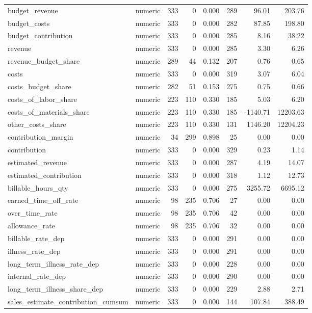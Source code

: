 \begin{landscape}
\begin{longtable}[t]{llrrrrrr}
budget\_revenue & numeric & 333 & 0 & 0.000 & 289 & 96.01 & 203.76\\
budget\_costs & numeric & 333 & 0 & 0.000 & 282 & 87.85 & 198.80\\
budget\_contribution & numeric & 333 & 0 & 0.000 & 285 & 8.16 & 38.22\\
revenue & numeric & 333 & 0 & 0.000 & 285 & 3.30 & 6.26\\
revenue\_budget\_share & numeric & 289 & 44 & 0.132 & 207 & 0.76 & 0.65\\
costs & numeric & 333 & 0 & 0.000 & 319 & 3.07 & 6.04\\
costs\_budget\_share & numeric & 282 & 51 & 0.153 & 275 & 0.75 & 0.66\\
costs\_of\_labor\_share & numeric & 223 & 110 & 0.330 & 185 & 5.03 & 6.20\\
costs\_of\_materials\_share & numeric & 223 & 110 & 0.330 & 185 & -1140.71 & 12203.63\\
other\_costs\_share & numeric & 223 & 110 & 0.330 & 131 & 1146.20 & 12204.23\\
contribution\_margin & numeric & 34 & 299 & 0.898 & 25 & 0.00 & 0.00\\
contribution & numeric & 333 & 0 & 0.000 & 329 & 0.23 & 1.14\\
estimated\_revenue & numeric & 333 & 0 & 0.000 & 287 & 4.19 & 14.07\\
estimated\_contribution & numeric & 333 & 0 & 0.000 & 318 & 1.12 & 12.73\\
billable\_hours\_qty & numeric & 333 & 0 & 0.000 & 275 & 3255.72 & 6695.12\\
earned\_time\_off\_rate & numeric & 98 & 235 & 0.706 & 27 & 0.00 & 0.00\\
over\_time\_rate & numeric & 98 & 235 & 0.706 & 42 & 0.00 & 0.00\\
allowance\_rate & numeric & 98 & 235 & 0.706 & 32 & 0.00 & 0.00\\
billable\_rate\_dep & numeric & 333 & 0 & 0.000 & 291 & 0.00 & 0.00\\
illness\_rate\_dep & numeric & 333 & 0 & 0.000 & 291 & 0.00 & 0.00\\
long\_term\_illness\_rate\_dep & numeric & 333 & 0 & 0.000 & 228 & 0.00 & 0.00\\
internal\_rate\_dep & numeric & 333 & 0 & 0.000 & 290 & 0.00 & 0.00\\
long\_term\_illness\_share\_dep & numeric & 333 & 0 & 0.000 & 229 & 2.88 & 2.71\\
sales\_estimate\_contribution\_cumsum & numeric & 333 & 0 & 0.000 & 144 & 107.84 & 388.49\\

\end{longtable}
\end{landscape}
